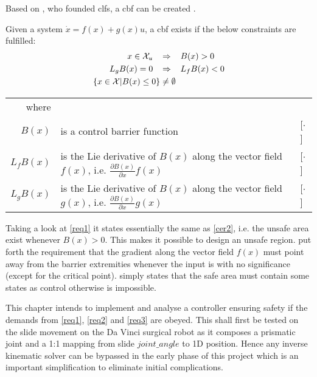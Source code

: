 Based on \citep{bib:artstein}, who founded \glspl{clf}, a \gls{cbf} can be created \citep{bib:org_control}. 
\begin{exa}
Given a system $\dot{x}=f(x)+g(x)u$, a \gls{cbf} exists if the below constraints are fulfilled:
\begin{subequations}
\begin{flalign}
x\in \mathcal{X}_u \hspace{0.3cm} &\Rightarrow \hspace{0.3cm} B(x) > 0  \label{req1} \\
L_gB(x) = 0 \hspace{0.3cm} &\Rightarrow \hspace{0.3cm} L_fB(x) < 0 \label{req2} \\
\{ x \in \mathcal{X} | B(x) \leq 0 \} &\neq \emptyset \label{req3}
\end{flalign}
\end{subequations}
\vspace{-0.6cm}
\begin{tabular}{r l l} 
where  & & \\
$B(x)$ & is a control barrier function & [$\cdot$] \\ 
$L_fB(x)$ & is the Lie derivative of $B(x)$ along the vector field  $f(x)$, i.e. $\frac{\partial B(x)}{\partial x}f(x)$ & [$\cdot$] \\ 
$L_gB(x)$ & is the Lie derivative of $B(x)$ along the vector field  $g(x)$, i.e. $\frac{\partial B(x)}{\partial x}g(x)$ & [$\cdot$] 
\end{tabular}
\vspace*{-0.2cm}
\end{exa}
Taking a look at \autoref{req1} it states essentially the same as \autoref{cer2}, i.e. the unsafe area exist whenever $B(x)>0$. This makes it possible to design an unsafe region.  put forth the requirement that the gradient along the vector field $f(x)$ must point away from the barrier extremities whenever the input is with no significance (except for the critical point).  simply states that the safe area must contain some states as control otherwise is impossible.

This chapter intends to implement and analyse a controller ensuring safety if the demands from \autoref{req1}, \ref{req2} and \ref{req3} are obeyed. This shall first be tested on the slide movement on the Da Vinci surgical robot as it composes a prismatic joint and a 1:1 mapping from slide $joint\_angle$ to 1D position. Hence any inverse kinematic solver can be bypassed in the early phase of this project which is an important simplification to eliminate initial complications.
